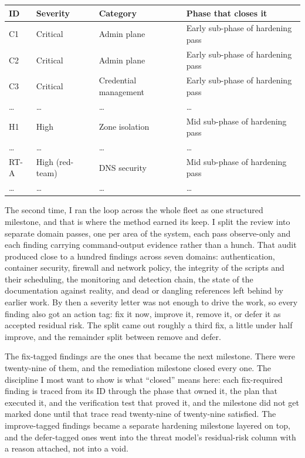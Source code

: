 \documentclass[12pt]{article}
\begin{document}
\begin{tabular}{|l|l|p{4cm}|p{4cm}|}
\hline
\textbf{ID} & \textbf{Severity} & \textbf{Category} & \textbf{Phase that closes it} \\
\hline
C1 & Critical & Admin plane & Early sub-phase of hardening pass \\
\hline
C2 & Critical & Admin plane & Early sub-phase of hardening pass \\
\hline
C3 & Critical & Credential management & Early sub-phase of hardening pass \\
\hline
\ldots & \ldots & \ldots & \ldots \\
\hline
H1 & High & Zone isolation & Mid sub-phase of hardening pass \\
\hline
\ldots & \ldots & \ldots & \ldots \\
\hline
RT-A & High (red-team) & DNS security & Mid sub-phase of hardening pass \\
\hline
\ldots & \ldots & \ldots & \ldots \\
\hline
\end{tabular}

The second time, I ran the loop across the whole fleet as one structured milestone, and that is where the method earned its keep. I split the review into separate domain passes, one per area of the system, each pass observe-only and each finding carrying command-output evidence rather than a hunch. That audit produced close to a hundred findings across seven domains: authentication, container security, firewall and network policy, the integrity of the scripts and their scheduling, the monitoring and detection chain, the state of the documentation against reality, and dead or dangling references left behind by earlier work. By then a severity letter was not enough to drive the work, so every finding also got an action tag: fix it now, improve it, remove it, or defer it as accepted residual risk. The split came out roughly a third fix, a little under half improve, and the remainder split between remove and defer.

The fix-tagged findings are the ones that became the next milestone. There were twenty-nine of them, and the remediation milestone closed every one. The discipline I most want to show is what ``closed'' means here: each fix-required finding is traced from its ID through the phase that owned it, the plan that executed it, and the verification test that proved it, and the milestone did not get marked done until that trace read twenty-nine of twenty-nine satisfied. The improve-tagged findings became a separate hardening milestone layered on top, and the defer-tagged ones went into the threat model's residual-risk column with a reason attached, not into a void.
\end{document}
